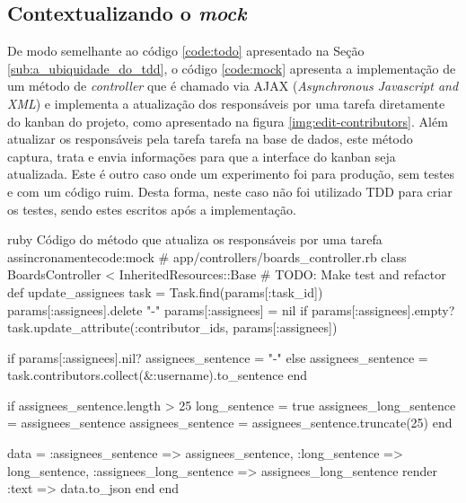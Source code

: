 \subsection{Contextualizando o \textit{mock}}
\label{sub:contextualizando_o_mock}

De modo semelhante ao código \ref{code:todo} apresentado na Seção \ref{sub:a_ubiquidade_do_tdd}, o código \ref{code:mock} apresenta a implementação de um método de \textit{controller} que é chamado via AJAX (\textit{Asynchronous Javascript and XML}) e implementa a atualização dos responsáveis por uma tarefa diretamente do kanban do projeto, como apresentado na figura \ref{img:edit-contributors}. Além atualizar os responsáveis pela tarefa tarefa na base de dados, este método captura, trata e envia informações para que a interface do kanban seja atualizada. Este é outro caso onde um experimento foi para produção, sem testes e com um código ruim. Desta forma, neste caso não foi utilizado TDD para criar os testes, sendo estes escritos após a implementação.

\newpage

\begin{mycode}{ruby}%
{Código do método que atualiza os responsáveis por uma tarefa assincronamente}{code:mock}
# app/controllers/boards_controller.rb
class BoardsController < InheritedResources::Base
  # TODO: Make test and refactor
  def update_assignees
    task = Task.find(params[:task_id])
    params[:assignees].delete "-"
    params[:assignees] = nil if params[:assignees].empty?
    task.update_attribute(:contributor_ids, params[:assignees])

    if params[:assignees].nil?
      assignees_sentence = "-"
    else
      assignees_sentence = task.contributors.collect(&:username).to_sentence
    end

    if assignees_sentence.length > 25
      long_sentence = true
      assignees_long_sentence = assignees_sentence
      assignees_sentence = assignees_sentence.truncate(25)
    end

    data = { :assignees_sentence => assignees_sentence,
             :long_sentence => long_sentence,
             :assignees_long_sentence => assignees_long_sentence }
    render :text => data.to_json
  end
end
\end{mycode}

